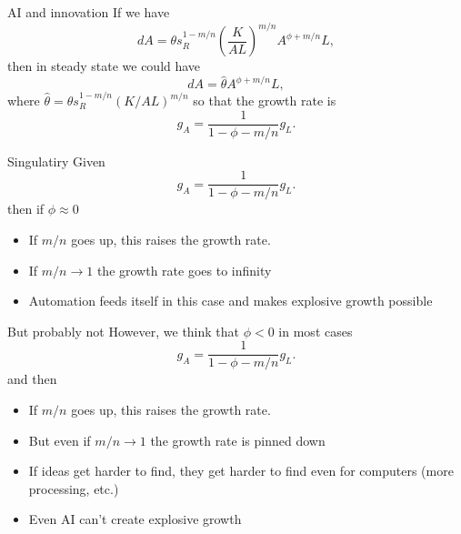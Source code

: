 \begin{frame}{AI and innovation}
If we have
\begin{equation}
	dA = \theta s_R^{1-m/n}\left(\frac{K}{AL}\right)^{m/n} A^{\phi+m/n} L, \nonumber
\end{equation}
then in steady state we could have
\begin{equation}
	dA = \hat{\theta} A^{\phi+m/n} L,
\end{equation}
where $\hat{\theta} = \theta s_R^{1-m/n} (K/AL)^{m/n}$ so that the growth rate is
\begin{equation}
	g_A = \frac{1}{1-\phi-m/n} g_L.
\end{equation}

\end{frame}

\begin{frame}{Singulatiry}
Given 
\begin{equation}
	g_A = \frac{1}{1-\phi-m/n} g_L.
\end{equation}
then if $\phi \approx 0$
\begin{itemize}
	\item If $m/n$ goes up, this raises the growth rate. 
	\item If $m/n \rightarrow 1$ the growth rate goes to infinity
	\item Automation feeds itself in this case and makes explosive growth possible
\end{itemize}

\end{frame}

\begin{frame}{But probably not}
However, we think that $\phi < 0$ in most cases
\begin{equation}
	g_A = \frac{1}{1-\phi-m/n} g_L.
\end{equation}
and then
\begin{itemize}
	\item If $m/n$ goes up, this raises the growth rate. 
	\item But even if $m/n \rightarrow 1$ the growth rate is pinned down
	\item If ideas get harder to find, they get harder to find even for computers (more processing, etc.)
	\item Even AI can't create explosive growth
\end{itemize}

\end{frame}

